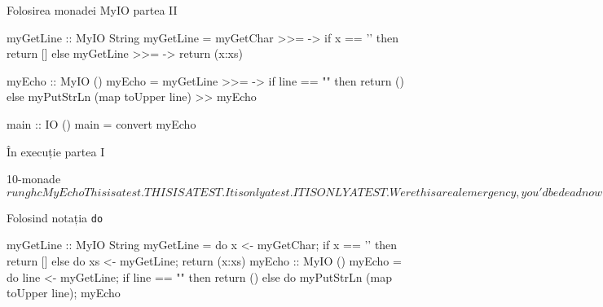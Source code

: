 \documentclass[xcolor=pdftex,romanian,colorlinks]{beamer}
\begin{document}

\begin{frame}[fragile]{Folosirea monadei MyIO}
{partea II}
\vspace{-2ex}
\begin{asciihs}
  myGetLine :: MyIO String
  myGetLine = myGetChar >>= \x ->
               if x == '\n' then
                 return []
               else
                 myGetLine >>= \xs ->
                 return (x:xs)

  myEcho :: MyIO ()
  myEcho = myGetLine >>= \line ->
            if line == "" then
              return ()
            else
              myPutStrLn (map toUpper line) >>
              myEcho

  main :: IO ()
  main = convert myEcho
\end{asciihs}
\end{frame}



\begin{frame}[fragile]{În execuție}
{partea I}
\begin{asciihs}
  10-monade$ runghc MyEcho
  This is a test.
  THIS IS A TEST.
  It is only a test.
  IT IS ONLY A TEST.
  Were this a real emergency, you'd be dead now.
  WERE THIS A REAL EMERGENCY, YOU'D BE DEAD NOW.

  10-monade$
\end{asciihs}
\end{frame}

\begin{frame}[fragile]{Folosind notația \lstinline$do$}
\vspace{-2ex}
\begin{asciihs}
  myGetLine :: MyIO String
  myGetLine = do {
                 x <- myGetChar;
                 if x == '\n' then
                   return []
                 else do {
                   xs <- myGetLine;
                   return (x:xs)
                 }
               }
  myEcho :: MyIO ()
  myEcho = do {
              line <- myGetLine;
              if line == "" then
                return ()
              else do {
                myPutStrLn (map toUpper line);
                myEcho
              } }
\end{asciihs}
\end{frame}


%
\end{document}
